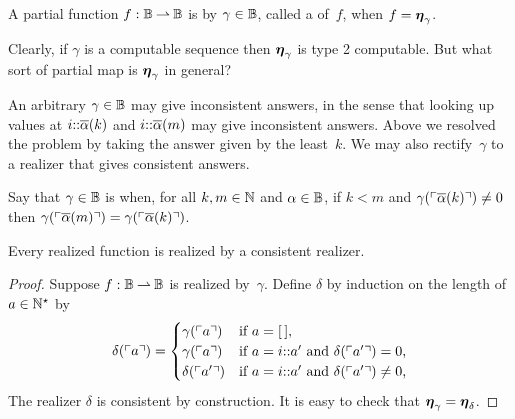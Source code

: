 \begin{definition}
  \label{def:type-2-realized}%
  A partial function $f : \mathbb{B} \mathbin{\rightharpoonup} \mathbb{B}$ is  by $\gamma \in \mathbb{B}$, called a  of~$f$, when $f = \text{\boldmath{$\eta$}}_\gamma$.
\end{definition}

Clearly, if $\gamma$ is a computable sequence then $\text{\boldmath{$\eta$}}_\gamma$ is type 2 computable.
But what sort of partial map is $\text{\boldmath{$\eta$}}_\gamma$ in general?

An arbitrary $\gamma \in \mathbb{B}$ may give inconsistent answers, in the sense that looking up values at $i {:}{:} \overline{\alpha}(k)$ and $i {:}{:} \overline{\alpha}(m)$ may give inconsistent answers. Above we resolved the problem by taking the answer given by the least~$k$. We may also rectify~$\gamma$ to a realizer that gives consistent answers.

Say that $\gamma \in \mathbb{B}$ is  when, for all $k, m \in \mathbb{N}$ and
$\alpha \in \mathbb{B}$, if $k < m$ and $\gamma(\ulcorner \overline{\alpha}(k) \urcorner) \neq 0$ then
$\gamma(\ulcorner \overline{\alpha}(m) \urcorner) = \gamma(\ulcorner \overline{\alpha}(k) \urcorner)$.

\begin{lemma}
  \label{lemma:normalized-BB}%
  Every realized function is realized by a consistent realizer.
\end{lemma}

\begin{proof}
  Suppose $f : \mathbb{B} \mathbin{\rightharpoonup} \mathbb{B}$ is realized by~$\gamma$. Define
  $\delta$ by induction on the length of $a \in \mathbb{N}^{\star}$ by
  \begin{equation*}
    \delta(\ulcorner a \urcorner) =
    \begin{cases}
      \gamma(\ulcorner a \urcorner) & \text{if $a = [\,]$,}\\
      \gamma(\ulcorner a \urcorner) & \text{if $a = i {:}{:} a'$ and
        $\delta(\ulcorner a' \urcorner) = 0$,}\\
      \delta(\ulcorner a' \urcorner) & \text{if $a = i {:}{:} a'$ and
        $\delta(\ulcorner a' \urcorner) \neq 0$,}
    \end{cases}
  \end{equation*}
  The realizer $\delta$ is consistent by construction. It is easy to check that $\text{\boldmath{$\eta$}}_\gamma = \text{\boldmath{$\eta$}}_\delta$.
\end{proof}


